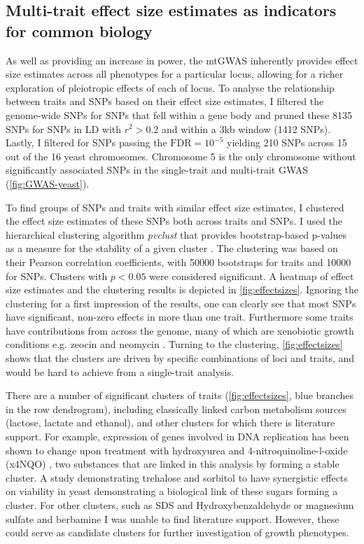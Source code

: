 \subsection{Multi-trait effect size estimates as indicators for common biology}
As well as providing an increase in power, the mtGWAS inherently provides effect size estimates across all phenotypes for a particular locus, allowing for a richer exploration of pleiotropic effects of each of locus.
To analyse the relationship between traits and SNPs based on their effect size estimates, I filtered the genome-wide SNPs for SNPs that fell within a gene body and pruned these \num{8135} SNPs for SNPs in LD  with \(r^2 > 0.2\) and within a \num{3}kb window (\num{1412} SNPs). Lastly, I filtered for SNPs passing the \(\text{FDR}=10^{-5}\) yielding \num{210} SNPs across \num{15} out of the \num{16} yeast chromosomes. Chromosome \num{5} is the only chromosome without significantly associated SNPs in the single-trait and multi-trait GWAS (\cref{fig:GWAS-yeast}). 

To find groups of SNPs and traits with similar effect size estimates, I clustered the effect size estimates of these SNPs both across traits and SNPs. I used the hierarchical clustering algorithm \textit{pvclust} that provides bootstrap-based p-values as a measure for the stability of a given cluster \cite{Suzuki2006}. The clustering was based on their Pearson correlation coefficients, with \num{50000} bootstraps for traits and \num{10000} for SNPs. Clusters with \(p < 0.05\) were considered significant. A heatmap of effect size estimates and the clustering results is depicted in \cref{fig:effectsizes}. Ignoring the clustering for a first impression of the results, one can clearly see that most SNPs have significant, non-zero effects in more than one trait. Furthermore some traits have contributions from across the genome, many of which are xenobiotic growth conditions e.g. zeocin \cite{Krol2015} and neomycin \cite{Alamgir2010}. Turning to the clustering, \cref{fig:effectsizes} shows that the clusters are driven by specific combinations of loci and traits, and would be hard to achieve from a single-trait analysis. 

There are a number of significant clusters of traits (\cref{fig:effectsizes}, blue branches in the row dendrogram), including classically linked carbon metabolism sources (lactose, lactate and ethanol), and other clusters for which there is literature support. For example, expression of genes involved in DNA replication has been shown to change upon treatment with hydroxyurea and \num{4}-nitroquinoline-l-oxide (x4NQO) \citep{Elledge1990}, two substances that are linked in this analysis by forming a stable cluster. A study demonstrating trehalose and sorbitol to have synergistic effects on viability in yeast \citep{Hua2015} demonstrating a biological link of these sugars forming a cluster. For other clusters, such as SDS and Hydroxybenzaldehyde or magnesium sulfate and berbamine I was unable to find literature support. However, these could serve as candidate clusters for further investigation of growth phenotypes.

